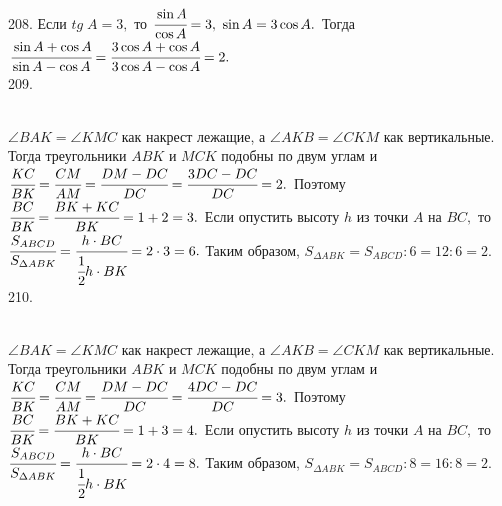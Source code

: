 \documentclass[12pt]{article}
\begin{document}
208. Если $tg\; A=3,$ то $\cfrac{\sin A}{\cos A}=3,\ \sin A=3\cos A.$ Тогда $\cfrac{\sin A +\cos A}{\sin A -\cos A}=\cfrac{3\cos A +\cos A}{3\cos A -\cos A}=2.$\\
209. \begin{figure}[ht!]
\end{figure}\\
$\angle BAK=\angle KMC$ как накрест лежащие, а $\angle AKB=\angle CKM$ как вертикальные. Тогда треугольники $ABK$ и $MCK$ подобны по двум углам и $\cfrac{KC}{BK}=\cfrac{CM}{AM}=\cfrac{DM-DC}{DC}=\cfrac{3DC-DC}{DC}=2.$ Поэтому $\cfrac{BC}{BK}=\cfrac{BK+KC}{BK}=1+2=3.$ Если опустить высоту $h$ из точки $A$ на $BC,$ то $\cfrac{S_{ABCD}}{S_{\Delta ABK}}=\cfrac{h\cdot BC}{\cfrac{1}{2}h\cdot BK}=2\cdot3=6.$ Таким образом, $S_{\Delta ABK}=S_{ABCD}:6=12:6=2.$\\
210. \begin{figure}[ht!]
\end{figure}\\
$\angle BAK=\angle KMC$ как накрест лежащие, а $\angle AKB=\angle CKM$ как вертикальные. Тогда треугольники $ABK$ и $MCK$ подобны по двум углам и $\cfrac{KC}{BK}=\cfrac{CM}{AM}=\cfrac{DM-DC}{DC}=\cfrac{4DC-DC}{DC}=3.$ Поэтому $\cfrac{BC}{BK}=\cfrac{BK+KC}{BK}=1+3=4.$ Если опустить высоту $h$ из точки $A$ на $BC,$ то $\cfrac{S_{ABCD}}{S_{\Delta ABK}}=\cfrac{h\cdot BC}{\cfrac{1}{2}h\cdot BK}=2\cdot4=8.$ Таким образом, $S_{\Delta ABK}=S_{ABCD}:8=16:8=2.$\\
\end{document}
